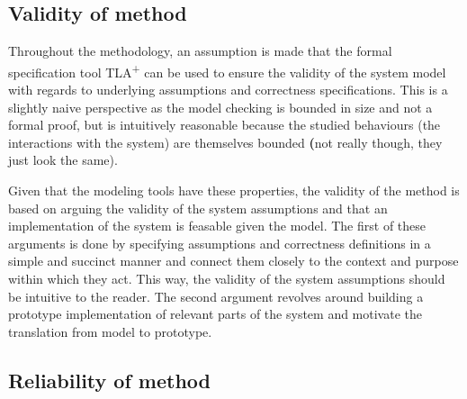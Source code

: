 \documentclass[english, biblatex, digitaloutput]{kththesis}
\begin{document}




\subsection{Validity of method}
\label{sec:validtyOfMethod}

Throughout the methodology, an assumption is made that the formal specification tool TLA\textsuperscript+ can be used to ensure the validity of the system model with regards to underlying assumptions and correctness specifications. This is a slightly naive perspective as the model checking is bounded in size and not a formal proof, but is intuitively reasonable because the studied behaviours (the interactions with the system) are themselves bounded \textbf({not really though, they just look the same)}.

Given that the modeling tools have these properties, the validity of the method is based on arguing the validity of the system assumptions and that an implementation of the system is feasable given the model. The first of these arguments is done by specifying assumptions and correctness definitions in a simple and succinct manner and connect them closely to the context and purpose within which they act. This way, the validity of the system assumptions should be intuitive to the reader. The second argument revolves around building a prototype implementation of relevant parts of the system and motivate the translation from model to prototype.

\subsection{Reliability of method}
\label{sec:reliabilityOfMethod}
\end{document}
